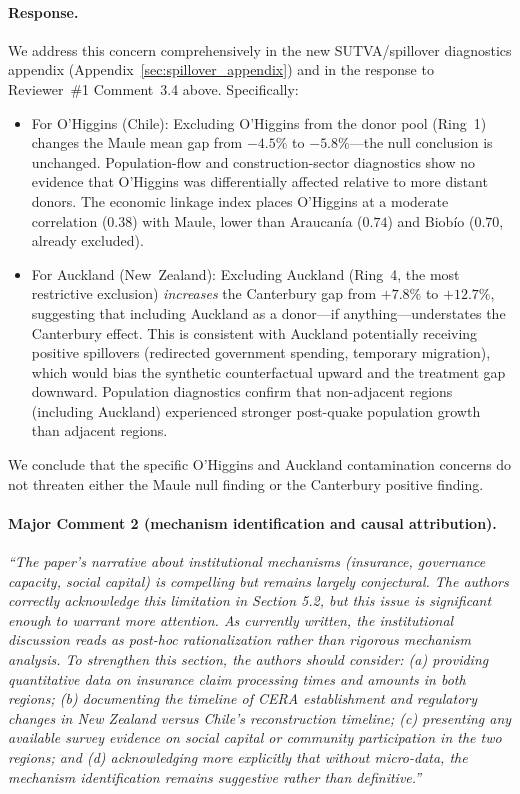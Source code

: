 \paragraph{Response.}
We address this concern comprehensively in the new SUTVA/spillover diagnostics appendix (Appendix~\ref{sec:spillover_appendix}) and in the response to Reviewer~\#1 Comment~3.4 above. Specifically:

\begin{itemize}
  \item For O'Higgins (Chile): Excluding O'Higgins from the donor pool (Ring~1) changes the Maule mean gap from $-4.5\%$ to $-5.8\%$---the null conclusion is unchanged. Population-flow and construction-sector diagnostics show no evidence that O'Higgins was differentially affected relative to more distant donors. The economic linkage index places O'Higgins at a moderate correlation ($0.38$) with Maule, lower than Araucanía ($0.74$) and Biobío ($0.70$, already excluded).
  \item For Auckland (New~Zealand): Excluding Auckland (Ring~4, the most restrictive exclusion) \emph{increases} the Canterbury gap from $+7.8\%$ to $+12.7\%$, suggesting that including Auckland as a donor---if anything---understates the Canterbury effect. This is consistent with Auckland potentially receiving positive spillovers (redirected government spending, temporary migration), which would bias the synthetic counterfactual upward and the treatment gap downward. Population diagnostics confirm that non-adjacent regions (including Auckland) experienced stronger post-quake population growth than adjacent regions.
\end{itemize}

We conclude that the specific O'Higgins and Auckland contamination concerns do not threaten either the Maule null finding or the Canterbury positive finding.

\paragraph{Major Comment 2 (mechanism identification and causal attribution).}
\textit{``The paper's narrative about institutional mechanisms (insurance, governance capacity, social capital) is compelling but remains largely conjectural. The authors correctly acknowledge this limitation in Section 5.2, but this issue is significant enough to warrant more attention. As currently written, the institutional discussion reads as post-hoc rationalization rather than rigorous mechanism analysis. To strengthen this section, the authors should consider: (a) providing quantitative data on insurance claim processing times and amounts in both regions; (b) documenting the timeline of CERA establishment and regulatory changes in New Zealand versus Chile's reconstruction timeline; (c) presenting any available survey evidence on social capital or community participation in the two regions; and (d) acknowledging more explicitly that without micro-data, the mechanism identification remains suggestive rather than definitive.''}

